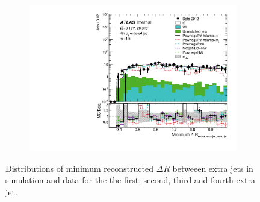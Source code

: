 \begin{figure}
\begin{subfigure}[]{0.45\textwidth}
\end{subfigure}
\begin{subfigure}[]{0.45\textwidth}
\includegraphics[width=\textwidth]{fig/MCComp/NLO/GrandPtVsRecoDRJet3.pdf}
\end{subfigure}
\caption{Distributions of minimum reconstructed $\Delta R$ betweeen extra jets in simulation and data for the the first, second, third and fourth extra jet. }
\label{fig:recodr}
\end{figure}
